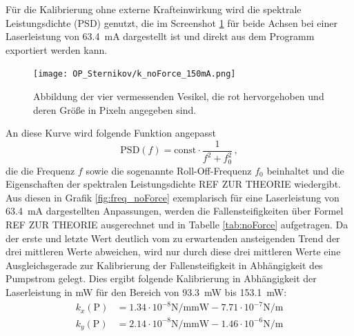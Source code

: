             Für die Kalibrierung ohne externe Krafteinwirkung wird die spektrale Leistungsdichte (PSD) genutzt, die im Screenshot \ref{fig:PSD} für beide Achsen bei einer Laserleistung von 
            \SI{63.4}{\milli\ampere} dargestellt ist und direkt aus dem Programm exportiert werden kann. 
            \begin{figure}[h]
            \centering
            \texttt{[image: OP\_Sternikov/k\_noForce\_150mA.png]}
            \caption{Abbildung der vier vermessenden Vesikel, die rot hervorgehoben und deren Größe in Pixeln angegeben sind.}
            \label{fig:PSD}
            \end{figure}
            \FloatBarrier
            An diese Kurve wird folgende Funktion angepasst
            \begin{equation*}
                \text{PSD}(f) = \text{const} \cdot \frac{1}{f^2+f_0^2} \, ,
            \end{equation*}
            die die Frequenz $f$ sowie die sogenannte Roll-Off-Frequenz $f_0$ beinhaltet und die Eigenschaften der spektralen Leistungsdichte REF ZUR THEORIE wiedergibt. Aus diesen in Grafik 
            \ref{fig:freq_noForce} exemplarisch für eine Laserleistung von \SI{63.4}{\milli\ampere} dargestellten Anpassungen, werden die Fallensteifigkeiten über Formel REF ZUR THEORIE ausgerechnet und in Tabelle
            \ref{tab:noForce} aufgetragen. Da der erste und letzte Wert deutlich vom zu erwartenden ansteigenden Trend der drei mittleren Werte abweichen, wird nur durch diese drei mittleren Werte eine Ausgleichsgerade zur 
            Kalibrierung der Fallensteifigkeit in Abhängigkeit des Pumpstrom gelegt. Dies ergibt folgende Kalibrierung in Abhängigkeit der Laserleistung in \si{\milli\watt} für den Bereich 
            von \SI{93.3}{\milli\watt} bis \SI{153.1}{\milli\watt}:
            \begin{align}
                k_x(\text{P}) &= 1.34\cdot10^{-8}\si{\newton\per\metre\milli\watt} - 7.71\cdot10^{-7}\si{\newton\per\metre} \\
                k_y(\text{P}) &= 2.14\cdot10^{-8}\si{\newton\per\metre\milli\watt} - 1.46\cdot10^{-6}\si{\newton\per\metre}
            \end{align}

